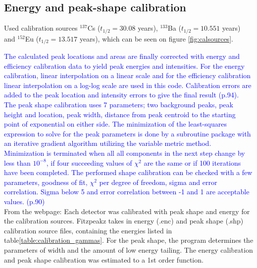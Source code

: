 \subsection{Energy and peak-shape calibration} \label{subsec:fitz_calibration}
Used calibration sources $^{137}$Cs ($t_{1/2}=30.08$ years\cite{Browne2007}), $^{133}$Ba ($t_{1/2}=10.551$ years\cite{Khazov2011}) and $^{152}$Eu ($t_{1/2}=13.517$ years\cite{Martin2013}), which can be seen on figure \ref{fig:calsources}.

\textcolor{blue}{The calculated peak locations and areas are finally corrected with energy and efficiency calibration data to yield peak energies and intensities. For the energy calibration, linear interpolation on a linear scale and for the efficiency calibration linear interpolation on a log-log scale are used in this code. Calibration errors are added to the peak location and intensity errors to give the final result (p.94). \\ The peak shape calibration uses 7 parameters; two background peaks, peak height and location, peak width, distance from peak centroid to the starting point of exponential on either side. The minimization of the least-squares expression to solve for the peak parameters is done by a subroutine package  with an iterative gradient algorithm utilizing the variable metric method. Minimization is terminated when all all components in the next step change by less than $10^{-8}$, if four succeeding values of $\chi^2$ are the same or if 100 iterations have been completed. The performed shape calibration can be checked with a few parameters, goodness of fit, $\chi^2$ per degree of freedom, sigma and error correlation. Sigma below 5 and error correlation between -1 and 1 are acceptable values.  (p.90)} \\


From the webpage:
Each detector was calibrated with peak shape and energy for the calibration sources. Fitzpeakz takes in energy (.enc) and peak shape (.shp) calibration source files, containing the energies listed in table\ref{table:calibration_gammas}. For the peak shape, the program determines the parameters of width and the amount of low energy tailing. The energy calibration and peak shape calibration was estimated to a 1st order function. 




